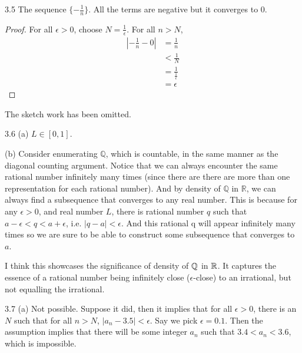 3.5 The sequence $\{-\frac{1}{n}\}$. All the terms are negative but it converges to 0. 
\begin{proof}
    For all $\epsilon>0$, choose $N = \frac{1}{\epsilon}$. For all $n>N$,
    \begin{align}
        |-\frac{1}{n}-0| &= \frac{1}{n}  \\
                         &< \frac{1}{N} \\
                         &= \frac{1}{\frac{1}{\epsilon}} \\
                         &= \epsilon
    \end{align}
\end{proof}
The sketch work has been omitted.

3.6 (a) $L \in [0,1]$.

(b) Consider enumerating $\mathbb{Q}$, which is countable, in the same manner as the diagonal counting argument. Notice that we can always encounter the same rational number
infinitely many times (since there are there are more than one representation for each rational number). And by density of $\mathbb{Q}$ in $\mathbb{R}$, we can always find a subsequence that converges to any real number.
This is because for any $\epsilon > 0$, and real number $L$, there is rational number $q$ such that $a-\epsilon < q < a+\epsilon$, i.e. $|q-a|<\epsilon$. And this rational q will appear infinitely many times so we are sure to
be able to construct some subsequence that converges to $a$. 

\begin{remark}
    I think this showcases the significance of density of $\mathbb{Q}$ in $\mathbb{R}$. It captures
    the essence of a rational number being infinitely close ($\epsilon$-close) to an irrational, but not
    equalling the irrational.
\end{remark}

3.7 (a) Not possible. Suppose it did, then it implies that for all $\epsilon>0$, there is an $N$ such that for all $n>N$,  $|a_n-3.5|<\epsilon$. Say we pick $\epsilon=0.1$. Then the assumption implies that there will be some integer $a_n$ such that $3.4 < a_n < 3.6$, which is impossible.

